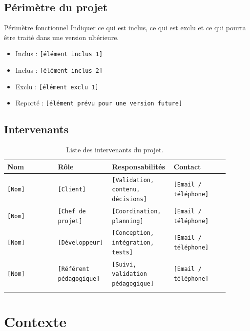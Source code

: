 \documentclass[11pt,a4paper]{report}
\newcommand{\placeholder}[1]{\textcolor{placeholderColor}{\texttt{[#1]}}}
\newcommand{\blankspace}[1]{\vspace*{#1}}
\begin{document}
\section{Périmètre du projet}
\begin{requirementbox}{Périmètre fonctionnel}
Indiquer ce qui est inclus, ce qui est exclu et ce qui pourra être traité dans une version ultérieure.
\end{requirementbox}

\begin{itemize}[leftmargin=*]
  \item Inclus : \placeholder{élément inclus 1}
  \item Inclus : \placeholder{élément inclus 2}
  \item Exclu : \placeholder{élément exclu 1}
  \item Reporté : \placeholder{élément prévu pour une version future}
\end{itemize}

\blankspace{4cm}

\section{Intervenants}
\begin{longtable}{p{0.22\linewidth}p{0.22\linewidth}p{0.22\linewidth}p{0.24\linewidth}}
\toprule
\textbf{Nom} & \textbf{Rôle} & \textbf{Responsabilités} & \textbf{Contact} \\
\midrule
\endhead
\placeholder{Nom} & \placeholder{Client} & \placeholder{Validation, contenu, décisions} & \placeholder{Email / téléphone} \\
\placeholder{Nom} & \placeholder{Chef de projet} & \placeholder{Coordination, planning} & \placeholder{Email / téléphone} \\
\placeholder{Nom} & \placeholder{Développeur} & \placeholder{Conception, intégration, tests} & \placeholder{Email / téléphone} \\
\placeholder{Nom} & \placeholder{Référent pédagogique} & \placeholder{Suivi, validation pédagogique} & \placeholder{Email / téléphone} \\
\bottomrule
\caption{Liste des intervenants du projet.}
\label{tab:intervenants}
\end{longtable}

\chapter{Contexte}
\end{document}
